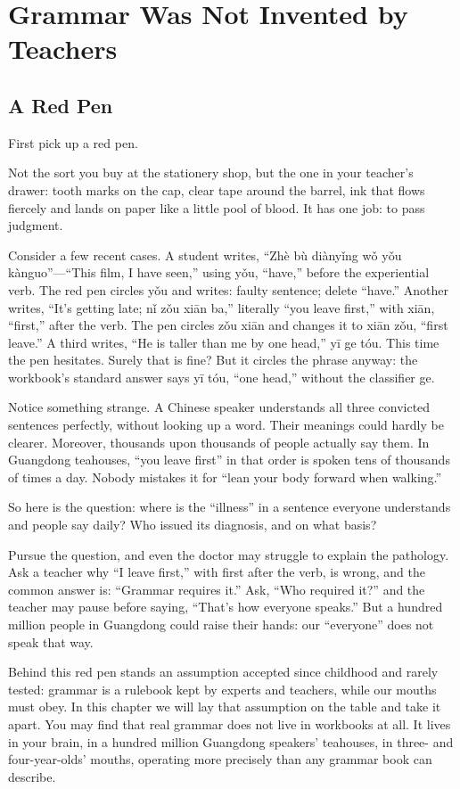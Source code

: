 \chapter[Who Invented Grammar?]{Grammar Was Not Invented by Teachers}
\section{A Red Pen}
First pick up a red pen.

Not the sort you buy at the stationery shop, but the one in your teacher's drawer: tooth marks on the cap, clear tape around the barrel, ink that flows fiercely and lands on paper like a little pool of blood. It has one job: to pass judgment.

Consider a few recent cases. A student writes, ``Zhè bù diànyǐng wǒ yǒu kànguo''---``This film, I have seen,'' using yǒu, ``have,'' before the experiential verb. The red pen circles yǒu and writes: faulty sentence; delete ``have.'' Another writes, ``It's getting late; nǐ zǒu xiān ba,'' literally ``you leave first,'' with xiān, ``first,'' after the verb. The pen circles zǒu xiān and changes it to xiān zǒu, ``first leave.'' A third writes, ``He is taller than me by one head,'' yī ge tóu. This time the pen hesitates. Surely that is fine? But it circles the phrase anyway: the workbook's standard answer says yī tóu, ``one head,'' without the classifier ge.

Notice something strange. A Chinese speaker understands all three convicted sentences perfectly, without looking up a word. Their meanings could hardly be clearer. Moreover, thousands upon thousands of people actually say them. In Guangdong teahouses, ``you leave first'' in that order is spoken tens of thousands of times a day. Nobody mistakes it for ``lean your body forward when walking.''

So here is the question: where is the ``illness'' in a sentence everyone understands and people say daily? Who issued its diagnosis, and on what basis?

Pursue the question, and even the doctor may struggle to explain the pathology. Ask a teacher why ``I leave first,'' with first after the verb, is wrong, and the common answer is: ``Grammar requires it.'' Ask, ``Who required it?'' and the teacher may pause before saying, ``That's how everyone speaks.'' But a hundred million people in Guangdong could raise their hands: our ``everyone'' does not speak that way.

Behind this red pen stands an assumption accepted since childhood and rarely tested: grammar is a rulebook kept by experts and teachers, while our mouths must obey. In this chapter we will lay that assumption on the table and take it apart. You may find that real grammar does not live in workbooks at all. It lives in your brain, in a hundred million Guangdong speakers' teahouses, in three- and four-year-olds' mouths, operating more precisely than any grammar book can describe.

